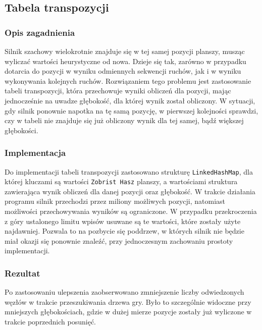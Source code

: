 \subsection{Tabela transpozycji}
\label{subsec:tabela-transpozycji}

\subsubsection{Opis zagadnienia}
Silnik szachowy wielokrotnie znajduje się w tej samej pozycji planszy, musząc wyliczać wartości heurystyczne od nowa.
Dzieje się tak, zarówno w przypadku dotarcia do pozycji w wyniku odmiennych sekwencji ruchów, jak i w wyniku wykonywania kolejnych ruchów.
Rozwiązaniem tego problemu jest zastosowanie tabeli transpozycji, która przechowuje wyniki obliczeń dla pozycji, mając jednocześnie na uwadze głębokość, dla której wynik został obliczony.
W sytuacji, gdy silnik ponownie napotka na tę samą pozycję, w pierwszej kolejności sprawdzi, czy w tabeli nie znajduje się już obliczony wynik dla tej samej, bądź większej głębokości.

\subsubsection{Implementacja}
Do implementacji tabeli transpozycji zastosowano strukturę \texttt{LinkedHashMap}, dla której kluczami są wartości \texttt{Zobrist Hasz} planszy, a wartościami struktura zawierająca wynik obliczeń dla danej pozycji oraz głębokość.
W trakcie działania programu silnik przechodzi przez miliony możliwych pozycji, natomiast możliwości przechowywania wyników są ograniczone.
W przypadku przekroczenia z góry ustalonego limitu wpisów usuwane są te wartości, które zostały użyte najdawniej.
Pozwala to na pozbycie się poddrzew, w których silnik nie będzie miał okazji się ponownie znaleźć, przy jednoczesnym zachowaniu prostoty implementacji.

\subsubsection{Rezultat}
Po zastosowaniu ulepszenia zaobserwowano zmniejszenie liczby odwiedzonych węzłów w trakcie przeszukiwania drzewa gry.
Było to szczególnie widoczne przy mniejszych głębokościach, gdzie w dużej mierze pozycje zostały już wyliczone w trakcie poprzednich posunięć.
